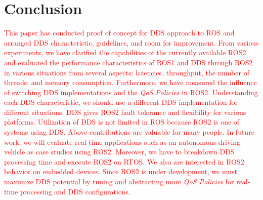 \documentclass{sig-alternate-05-2015}
\begin{document}
\vspace{-3mm}
\section{Conclusion}
\label{sec:orgheadline4}
\textcolor{red}{
This paper has conducted proof of concept for DDS approach to ROS and arranged DDS characteristic, guidelines, and room for improvement.
From various experiments, we have clarified the capabilities of the currently available ROS2 and evaluated the performance characteristics of ROS1 and DDS through ROS2 in various situations from several aspects: latencies, throughput, the number of threads, and memory consumption.
Furthermore, we have measured the influence of switching DDS implementations and the \emph{QoS Policies} in ROS2.
Understanding each DDS characteristic, we should use a different DDS implementation for different situations.
DDS gives ROS2 fault tolerance and flexibility for various platforms.
Utilization of DDS is not limited in ROS because ROS2 is one of systems using DDS.
Above contributions are valuable for many people.
}
\clearpage
\textcolor{red}{
In future work, we will evaluate real-time applications such as an autonomous driving vehicle \cite{kato2015open} as case studies using ROS2. 
Moreover, we have to breakdown DDS processing time and execute ROS2 on RTOS.
We also are interested in ROS2 behavior on embedded devices.
Since ROS2 is under development, we must maximize DDS potential by tuning and abstracting more \emph{QoS Policies} for real-time processing and DDS configurations.
}

\setlength{\baselineskip}{11pt}      %


\end{document}
